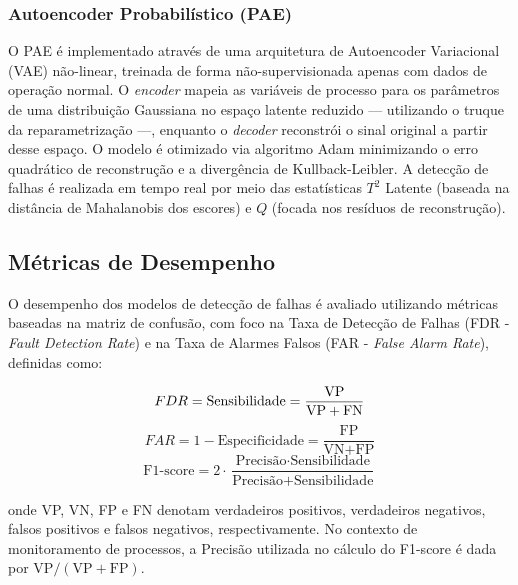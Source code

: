 \documentclass[journal]{IEEEtran}
\begin{document}
\subsubsection{Autoencoder Probabilístico (PAE)}

O PAE é implementado através de uma arquitetura de Autoencoder Variacional (VAE) não-linear, treinada de forma não-supervisionada apenas com dados de operação normal. O \textit{encoder} mapeia as variáveis de processo para os parâmetros de uma distribuição Gaussiana no espaço latente reduzido — utilizando o truque da reparametrização —, enquanto o \textit{decoder} reconstrói o sinal original a partir desse espaço. O modelo é otimizado via algoritmo Adam minimizando o erro quadrático de reconstrução e a divergência de Kullback-Leibler. A detecção de falhas é realizada em tempo real por meio das estatísticas $T^2$ Latente (baseada na distância de Mahalanobis dos escores) e $Q$ (focada nos resíduos de reconstrução).

\subsection{Métricas de Desempenho}
\label{subsec:metrics}

O desempenho dos modelos de detecção de falhas é avaliado utilizando métricas baseadas na matriz de confusão, com foco na Taxa de Detecção de Falhas (FDR - \textit{Fault Detection Rate}) e na Taxa de Alarmes Falsos (FAR - \textit{False Alarm Rate}), definidas como:

\begin{equation}
    FDR = \text{Sensibilidade} = \frac{\text{VP}}{\text{VP} + \text{FN}} \label{eq:fdr} \\
\end{equation}
\begin{equation}
    FAR = 1 - \text{Especificidade} = \frac{\text{FP}}{\text{VN} + \text{FP}} \label{eq:far}
\end{equation}
\begin{equation}
    \label{eq:f1}
    \text{F1-score} = 2 \cdot \frac{\text{Precisão} \cdot \text{Sensibilidade}}{\text{Precisão} + \text{Sensibilidade}}
\end{equation}

onde VP, VN, FP e FN denotam verdadeiros positivos, verdadeiros negativos, falsos positivos e falsos negativos, respectivamente. No contexto de monitoramento de processos, a Precisão utilizada no cálculo do F1-score é dada por $\text{VP} / (\text{VP} + \text{FP})$.
\end{document}
